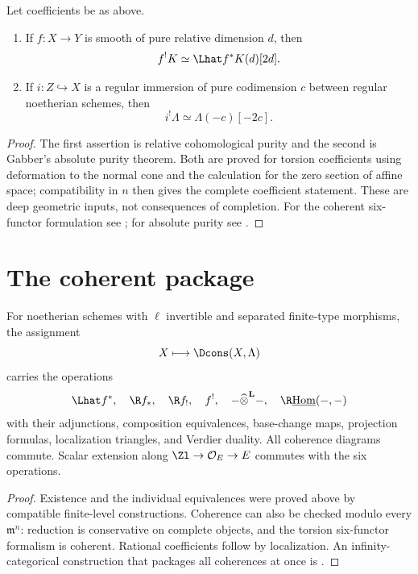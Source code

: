 \begin{theorem}
\label{thm:proetale-purity-inputs}
Let coefficients be as above.
\begin{enumerate}
\item If \(f:X\to Y\) is smooth of pure relative dimension \(d\), then
\[
 f^!K\simeq\Lhat f^*K(d)[2d].
\]
\item If \(i:Z\hookrightarrow X\) is a regular immersion of pure codimension
\(c\) between regular noetherian schemes, then
\[
 i^!\Lambda\simeq\Lambda(-c)[-2c].
\]
\end{enumerate}
\end{theorem}

\begin{proof}
The first assertion is relative cohomological purity and the second is
Gabber's absolute purity theorem.  Both are proved for torsion coefficients
using deformation to the normal cone and the calculation for the zero
section of affine space; compatibility in \(n\) then gives the complete
coefficient statement.  These are deep geometric inputs, not consequences
of completion.  For the coherent six-functor formulation see
\cite[Theorems~7.15, 7.16, and 7.19]{ScholzeSixFunctors}; for absolute purity
see \cite{ILOTravauxGabber}.
\end{proof}

\section{The coherent package}

\begin{theorem}
\label{thm:proetale-six-functor-package}
For noetherian schemes with \(\ell\) invertible and separated finite-type
morphisms, the assignment
\[
 X\longmapsto\Dcons(X,\Lambda)
\]
carries the operations
\[
 \Lhat f^*,\quad \R f_*,\quad \R f_!,\quad f^!,
 \quad -\widehat\otimes^{\mathbf L}-,
 \quad \R\underline{\operatorname{Hom}}(-,-)
\]
with their adjunctions, composition equivalences, base-change maps,
projection formulas, localization triangles, and Verdier duality.  All
coherence diagrams commute.  Scalar extension along
\(\Zl\to\mathcal O_E\to E\) commutes with the six operations.
\end{theorem}

\begin{proof}
Existence and the individual equivalences were proved above by compatible
finite-level constructions.  Coherence can also be checked modulo every
\(\mathfrak m^n\): reduction is conservative on complete objects, and the
torsion six-functor formalism is coherent.  Rational coefficients follow by
localization.  An infinity-categorical construction that packages all
coherences at once is \cite[Theorem~7.15]{ScholzeSixFunctors}.
\end{proof}

